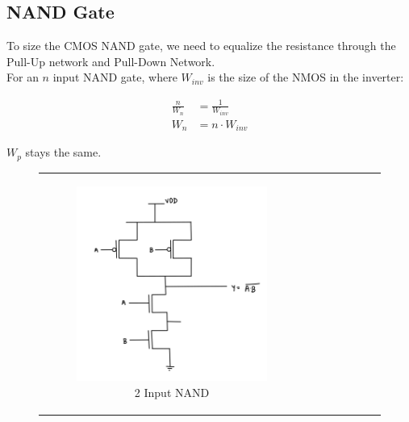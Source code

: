 \documentclass[conference]{IEEEtran}
\begin{document}
\subsection{NAND Gate}

To size the CMOS NAND gate, we need to equalize the resistance through the Pull-Up network and Pull-Down Network. \\
For an $n$ input NAND gate, where $W_{inv}$ is the size of the NMOS in the inverter:

\begin{align}
    \frac{n}{W_n} &= \frac{1}{W_{inv}} \\
    W_n &= n \cdot W_{inv}
\end{align}

$W_p$ stays the same.

\begin{figure}[H]
    \centering
    \begin{tabular}{cc}
        \begin{subfigure}{0.44\linewidth}
            \centering
            \includegraphics[width=\textwidth]{images/nand_cmos_circuit_diagram.png}
            \caption{2 Input NAND}
        \end{subfigure} &
        \begin{subfigure}{0.44\linewidth}
            \centering

\end{subfigure}
\end{tabular}
\end{figure}
\end{document}

